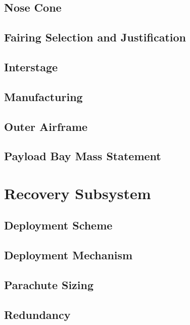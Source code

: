     \subsection{Nose Cone}
    
    \subsection{Fairing Selection and Justification}
    
    \subsection{Interstage}
    
    \subsection{Manufacturing}
    
    \subsection{Outer Airframe}
    
    \subsection{Payload Bay Mass Statement}
    
\section{Recovery Subsystem}

    \subsection{Deployment Scheme}
    
    \subsection{Deployment Mechanism}
    
    \subsection{Parachute Sizing}
    
    \subsection{Redundancy}
    
